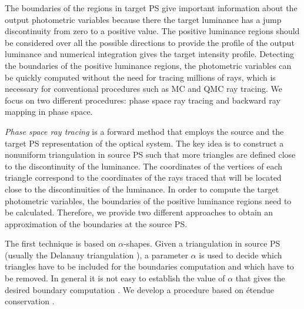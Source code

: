 The boundaries of the regions in target PS give important information about the output photometric variables because there the target luminance has a jump discontinuity from zero to a positive value. 
The positive luminance regions should be considered over all the possible directions to provide the profile of the output luminance and numerical integration gives the target intensity profile. Detecting the boundaries of the positive luminance regions, the photometric variables can be quickly computed without the need for tracing millions of rays, which is necessary for conventional procedures such as MC and QMC ray tracing. We focus on two different procedures: phase space ray tracing and backward ray mapping in phase space.

\textit{Phase space ray tracing} is a forward method that employs the source and the target PS representation of the optical system. The key idea is to construct a nonuniform triangulation in source PS such that more triangles are defined close to the discontinuity of the luminance. The coordinates of the vertices of each triangle correspond to the coordinates of the rays traced that will be located close to the discontinuities of the luminance. In order to compute the target photometric variables, the boundaries of the positive luminance regions need to be calculated. 
Therefore, we provide two different approaches to obtain an approximation of the boundaries at the source PS.

The first technique is based on $\alpha$-shapes. 
Given a triangulation in source PS (usually the Delanauy triangulation \cite{marsden2003texts}), a parameter $\alpha$ is used to decide which triangles have to be included for the boundaries computation and which have to be removed. In general it is not easy to establish the value of $\alpha$ that gives the desired boundary computation \cite{teichmann1998surface}. We develop a procedure based on \'{e}tendue conservation \cite{filosa2015new}. 

